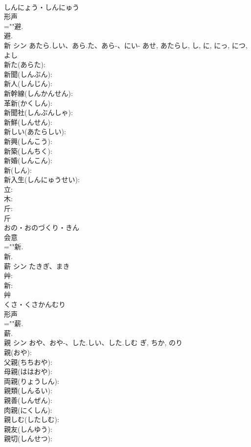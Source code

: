 \documentclass[8pt]{extreport}
\begin{document}
\begin{CJK}{UTF8}{min}
\\	しんにょう・しんにゅう	
\\	形声 
\\	=""避.
\\	避.
\\	新	シン	あたら.しい、あら.た、あら-、にい-	あせ, あたらし, し, に, にっ, につ, よし	
\\	新た(あらた): 
\\	新聞(しんぶん): 
\\	新人(しんじん): 
\\	新幹線(しんかんせん): 
\\	革新(かくしん): 
\\	新聞社(しんぶんしゃ): 
\\	新鮮(しんせん): 
\\	新しい(あたらしい): 
\\	新興(しんこう): 
\\	新築(しんちく): 
\\	新婚(しんこん): 
\\	新(しん): 
\\	新入生(しんにゅうせい): 
\\	立: 
\\	木: 
\\	斤: 
\\	斤	
\\	おの・おのづくり・きん	
\\	会意 
\\	=""新.
\\	新.
\\	薪	シン	たきぎ、まき		
\\	艸: 
\\	新: 
\\	艸	
\\	くさ・くさかんむり	
\\	形声 
\\	=""薪.
\\	薪.
\\	親	シン	おや、おや-、した.しい、した.しむ	ぎ, ちか, のり	
\\	親(おや): 
\\	父親(ちちおや): 
\\	母親(ははおや): 
\\	両親(りょうしん): 
\\	親類(しんるい): 
\\	親善(しんぜん): 
\\	肉親(にくしん): 
\\	親しむ(したしむ): 
\\	親友(しんゆう): 
\\	親切(しんせつ): 

\end{CJK}
\end{document}
